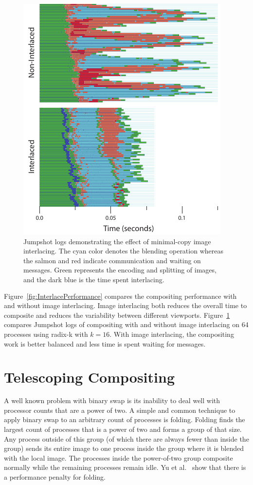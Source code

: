 \documentclass{acm_proc_article-sp}
\newcommand*{\scite}[1]{~\cite{#1}}
\newcommand{\etal}{et al.}
\begin{document}
\begin{figure}[htbp]
  \centering
  \includegraphics{images/InterlaceJumpshot}
  \caption{Jumpshot logs demonstrating the effect of minimal-copy image
    interlacing.  The cyan color denotes the blending operation whereas the
    salmon and red indicate communication and waiting on messages.  Green
    represents the encoding and splitting of images, and the dark blue is
    the time spent interlacing.}
  \label{fig:InterlaceJumpshot}
\end{figure}

Figure~\ref{fig:InterlacePerformance} compares the compositing
performance with and without image interlacing.  Image interlacing both
reduces the overall time to composite and reduces the variability between
different viewports.  Figure~\ref{fig:InterlaceJumpshot} compares
Jumpshot logs of compositing with and without image interlacing on 64
processes using radix-k with $k = 16$.  With image interlacing, the
compositing work is better balanced and less time is spent waiting for
messages.

\section{Telescoping Compositing}
\label{sec:TelescopingCompositing}

A well known problem with binary swap is its inability to deal well with
processor counts that are a power of two.  A simple and common technique to
apply binary swap to an arbitrary count of processes is folding.  Folding
finds the largest count of processes that is a power of two and forms a
group of that size.  Any process outside of this group (of which there are
always fewer than inside the group) sends its entire image to one process
inside the group where it is blended with the local image.  The processes
inside the power-of-two group composite normally while the remaining
processes remain idle.  Yu \etal\scite{23Swap} show that there is a
performance penalty for folding.
\end{document}
